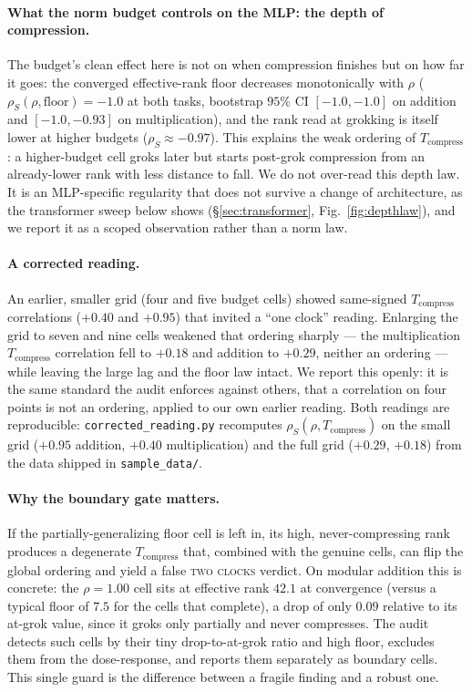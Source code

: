 \documentclass[11pt]{article}
\begin{document}
\paragraph{What the norm budget controls on the MLP: the depth of compression.} The budget's clean effect
here is not on when compression finishes but on how far it goes: the converged
effective-rank floor decreases monotonically with $\rho$ ($\rho_S(\rho,\text{floor})=-1.0$ at both tasks,
bootstrap $95\%$ CI $[-1.0,-1.0]$ on addition and $[-1.0,-0.93]$ on multiplication), and the rank read
at grokking is itself lower at higher budgets ($\rho_S\approx-0.97$). This explains the weak
ordering of $T_{\mathrm{compress}}$: a higher-budget cell groks later but starts post-grok compression
from an already-lower rank with less distance to fall. We do not over-read this depth law. It is an
MLP-specific regularity that does not survive a change of architecture, as the transformer sweep
below shows (\S\ref{sec:transformer}, Fig.~\ref{fig:depthlaw}), and we report it as a scoped observation
rather than a norm law.

\paragraph{A corrected reading.} An earlier, smaller grid (four and five budget cells) showed
same-signed $T_{\mathrm{compress}}$ correlations ($+0.40$ and $+0.95$) that invited a ``one clock''
reading. Enlarging the grid to seven and nine cells weakened that ordering sharply --- the
multiplication $T_{\mathrm{compress}}$ correlation fell to $+0.18$ and addition to $+0.29$, neither an
ordering --- while leaving the large lag and the floor law intact. We report this openly: it is the same
standard the audit enforces against others, that a correlation on four points is not an ordering,
applied to our own earlier reading. Both readings are reproducible: \texttt{corrected\_reading.py}
recomputes $\rho_S(\rho,T_{\mathrm{compress}})$ on the small grid ($+0.95$ addition, $+0.40$
multiplication) and the full grid ($+0.29$, $+0.18$) from the data shipped in \texttt{sample\_data/}.


\paragraph{Why the boundary gate matters.} If the partially-generalizing floor cell is left in, its
high, never-compressing rank produces a degenerate $T_{\mathrm{compress}}$ that, combined with the
genuine cells, can flip the global ordering and yield a false \textsc{two clocks} verdict. On modular
addition this is concrete: the $\rho=1.00$ cell sits at effective rank $42.1$ at convergence (versus a
typical floor of $7.5$ for the cells that complete), a drop of only $0.09$ relative to its at-grok
value, since it groks only partially and never compresses. The audit detects such cells by their tiny
drop-to-at-grok ratio and high floor, excludes them from the dose-response, and reports them
separately as boundary cells. This single guard is the difference between a fragile finding and a
robust one.
\end{document}
